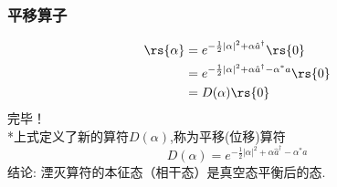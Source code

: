 \begin{frame}
      \frametitle{平移算子}
      \[\begin{aligned}
        \rs{\alpha}
        &=  e^{-\frac{1}{2}\left|\alpha\right|^2 + \alpha \hat{a}^\dagger }  \rs{0} \\
        &=  e^{-\frac{1}{2}\left|\alpha\right|^2 + \alpha \hat{a}^\dagger -\alpha^{*} a}  \rs{0}  \\ 
        &=  D(\alpha)  \rs{0} 
    \end{aligned}    
    \]  
    完毕！\\ {\vspace*{1.3em}}
    *上式定义了新的算符$D(\alpha)$,称为平移(位移)算符
      \[D(\alpha)= e^{-\frac{1}{2}\left|\alpha\right|^2 + \alpha \hat{a}^\dagger -\alpha^{*} a}\]
      结论: 湮灭算符的本征态（相干态）是真空态平衡后的态. \\ 
\end{frame}
    

